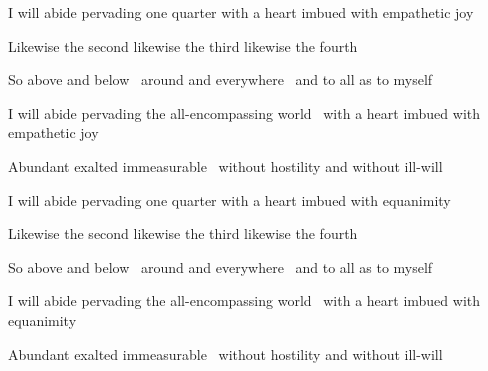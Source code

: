 \begin{english-hang}
  I will abide pervading one quarter with a heart imbued with empathetic joy\ifdigitalversion\makeatletter\hyperlink{endnote97-appendix}\makeatother\fi
\end{english-hang}
\begin{english}
  Likewise the second likewise the third likewise the fourth\\
\end{english}
\begin{english-hang}
  So above and below \breathmark\ around and everywhere \breathmark\ and to all as to myself
\end{english-hang}
\begin{english-hang}
  I will abide pervading the all-encompassing world \breathmark\ with a heart imbued with empathetic joy
\end{english-hang}
\begin{english-hang}
  Abundant exalted immeasurable \breathmark\ without hostility and without ill-will
\end{english-hang}

\smallskip

\begin{english-hang}
  I will abide pervading one quarter with a heart imbued with equanimity
\end{english-hang}
\begin{english}
  Likewise the second likewise the third likewise the fourth\\
\end{english}
\begin{english-hang}
  So above and below \breathmark\ around and everywhere \breathmark\ and to all as to myself
\end{english-hang}
\begin{english-hang}
  I will abide pervading the all-encompassing world \breathmark\ with a heart imbued with equanimity
\end{english-hang}
\begin{english-hang}
  Abundant exalted immeasurable \breathmark\ without hostility and without ill-will
\end{english-hang}

\suttaRef{[DN 13]}

\ifdigitalversion{}\fi



